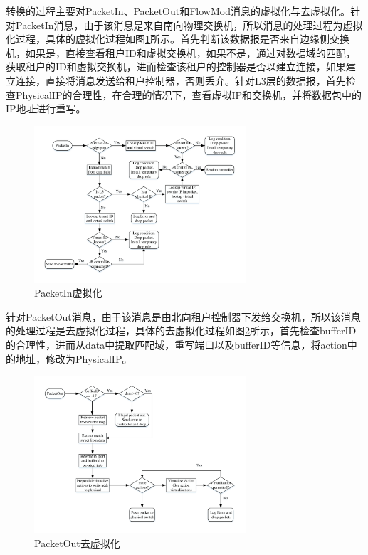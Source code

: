 转换的过程主要对PacketIn、PacketOut和FlowMod消息的虚拟化与去虚拟化。针对PacketIn消息，由于该消息是来自南向物理交换机，所以消息的处理过程为虚拟化过程，具体的虚拟化过程如图\ref{fig:packetin}所示。首先判断该数据报是否来自边缘侧交换机，如果是，直接查看租户ID和虚拟交换机，如果不是，通过对数据域的匹配，获取租户的ID和虚拟交换机，进而检查该租户的控制器是否以建立连接，如果建立连接，直接将消息发送给租户控制器，否则丢弃。针对L3层的数据报，首先检查PhysicalIP的合理性，在合理的情况下，查看虚拟IP和交换机，并将数据包中的IP地址进行重写。

\begin{figure}[!htb]
  \centering
  \includegraphics[width=0.7\textwidth]{logo/PacketIn}
  \caption{PacketIn虚拟化}
  \label{fig:packetin}
\end{figure}

针对PacketOut消息，由于该消息是由北向租户控制器下发给交换机，所以该消息的处理过程是去虚拟化过程，具体的去虚拟化过程如图\ref{fig:packetout}所示，首先检查bufferID的合理性，进而从data中提取匹配域，重写端口以及bufferID等信息，将action中的地址，修改为PhysicalIP。

\begin{figure}[!htb]
  \centering
  \includegraphics[width=0.7\textwidth]{logo/PacketOut}
  \caption{PacketOut去虚拟化}
  \label{fig:packetout}
\end{figure}

